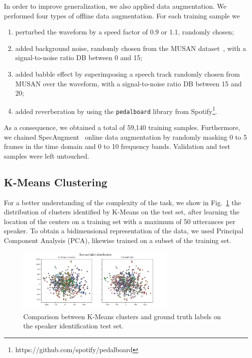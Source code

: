 \documentclass[conference]{IEEEtran}
\begin{document}
In order to improve generalization, we also applied data augmentation. We performed four types of offline data augmentation. For each training sample we
\begin{enumerate}
    \item perturbed the waveform by a speed factor of 0.9 or 1.1, randomly chosen;
    \item added background noise, randomly chosen from the MUSAN dataset~\cite{snyder2015musan}, with a signal-to-noise ratio DB between 0 and 15;
    \item added babble effect by superimposing a speech track randomly chosen from MUSAN over the waveform, with a signal-to-noise ratio DB between 15 and 20;
    \item added reverberation by using the \texttt{pedalboard} library from Spotify\footnote{https://github.com/spotify/pedalboard}.
\end{enumerate}
As a consequence, we obtained a total of 59,140 training samples. Furthermore, we chained SpecAugment~\cite{park2019specaug} online data augmentation by randomly masking 0 to 5 frames in the time domain and 0 to 10 frequency bands. Validation and test samples were left untouched.

\subsection{K-Means Clustering}

For a better understanding of the complexity of the task, we show in Fig.~\ref{fig:k_means} the distribution of clusters identified by K-Means on the test set, after learning the location of the centers on a training set with a maximum of 50 utterances per speaker. To obtain a bidimensional representation of the data, we used Principal Component Analysis (PCA), likewise trained on a subset of the training set.

\begin{figure}[htbp]
    \centerline{\includegraphics[width=0.7\textwidth]{img/k_means.png}}
    \caption{Comparison between K-Means clusters and ground truth labels on the speaker identification test set.}
    \label{fig:k_means}
\end{figure}
\end{document}
